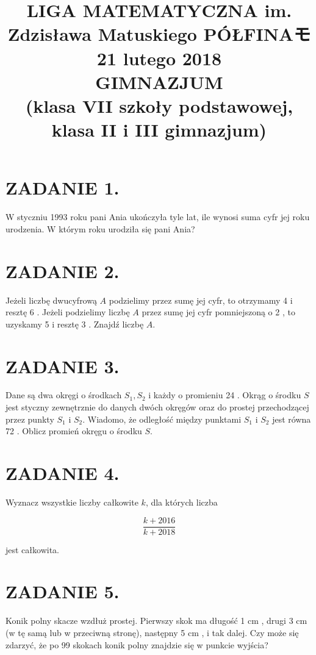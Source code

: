 \documentclass[10pt]{article}
\title{LIGA MATEMATYCZNA im. Zdzisława Matuskiego PÓŁFINAモ \\
 21 lutego 2018 \\
 GIMNAZJUM \\
 (klasa VII szkoły podstawowej, klasa II i III gimnazjum) }
\author{}
\date{}
\begin{document}
\maketitle
\section*{ZADANIE 1.}
W styczniu 1993 roku pani Ania ukończyła tyle lat, ile wynosi suma cyfr jej roku urodzenia. W którym roku urodziła się pani Ania?

\section*{ZADANIE 2.}
Jeżeli liczbę dwucyfrową \(A\) podzielimy przez sumę jej cyfr, to otrzymamy 4 i resztę 6 . Jeżeli podzielimy liczbę \(A\) przez sumę jej cyfr pomniejszoną o 2 , to uzyskamy 5 i resztę 3 . Znajdź liczbę \(A\).

\section*{ZADANIE 3.}
Dane są dwa okręgi o środkach \(S_{1}, S_{2}\) i każdy o promieniu 24 . Okrąg o środku \(S\) jest styczny zewnętrznie do danych dwóch okręgów oraz do prostej przechodzącej przez punkty \(S_{1}\) i \(S_{2}\). Wiadomo, że odległość między punktami \(S_{1}\) i \(S_{2}\) jest równa 72 . Oblicz promień okręgu o środku \(S\).

\section*{ZADANIE 4.}
Wyznacz wszystkie liczby całkowite \(k\), dla których liczba

\[
\frac{k+2016}{k+2018}
\]

jest całkowita.

\section*{ZADANIE 5.}
Konik polny skacze wzdłuż prostej. Pierwszy skok ma długość 1 cm , drugi 3 cm (w tę samą lub w przeciwną stronę), następny 5 cm , i tak dalej. Czy może się zdarzyć, że po 99 skokach konik polny znajdzie się w punkcie wyjścia?
\end{document}
